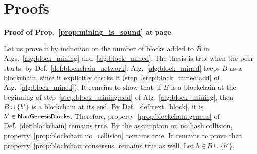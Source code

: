 \newpage

\appendix
\section{Proofs}

\noindent
\textbf{Proof of Prop.~\ref{prop:mining_is_sound} at page~\pageref{prop:mining_is_sound}}

\noindent
  Let us prove it by induction on the number of blocks added to $B$ in Algs.~\ref{alg:block_mining}
  and~\ref{alg:block_mined}. The thesis is true when the peer starts,
  by Def.~\ref{def:blockchain_network}. Alg.~\ref{alg:block_mined} keeps $B$
  as a blockchain, since it explicitly checks it (step~\ref{step:block_mined:add} of
  Alg.~\ref{alg:block_mined}). It remains to show that, if $B$ is a blockchain at the beginning
  of step~\ref{step:block_mining:add} of Alg.~\ref{alg:block_mining}, then $B\cup\{b'\}$ is a
  blockchain at its end. By Def.~\ref{def:next_block}, it is $b'\in{\mathsf{NonGenesisBlocks}}$.
  Therefore, property~\ref{prop:blockchain:genesis} of Def.~\ref{def:blockchain} remains true.
  By the assumption on no hash collision, property~\ref{prop:blockchain:no_collision} remains true.
  It remains to prove that property~\ref{prop:blockchain:consensus} remains true as well.
  Let $b\in B\cup\{b'\}$.
